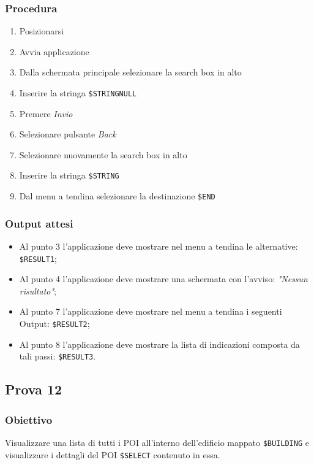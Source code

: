 \documentclass[../Sperimentazione.tex]{subfiles}
\begin{document}
	\subsubsection{Procedura}
		\begin{enumerate}
		
		
		\item Posizionarsi 
		\item Avvia applicazione
		\item Dalla schermata principale selezionare la search box in alto
		\item Inserire la stringa  \verb|$STRINGNULL|
		\item Premere \textit{Invio}
		\item Selezionare pulsante \textit{Back}
		\item Selezionare nuovamente la search box in alto
		\item Inserire la stringa  \verb|$STRING|
		\item Dal menu a tendina selezionare la destinazione  \verb|$END|
		\end{enumerate}
		
	\subsubsection{Output attesi}
		\begin{itemize}
		\item Al punto 3 l'applicazione deve mostrare nel menu a tendina le alternative:  \verb|$RESULT1|;
		\item Al punto 4 l'applicazione deve mostrare una schermata con l'avviso: \textit{"Nessun risultato"};
		\item Al punto 7 l'applicazione deve mostrare nel menu a tendina i seguenti Output:  \verb|$RESULT2|;
		\item Al punto 8 l'applicazione deve mostrare la lista di indicazioni composta da tali passi:  \verb|$RESULT3|.
		\end{itemize}

	


\newpage	
\subsection{Prova 12} %
\label{subsec:Prova12}
	
	\subsubsection{Obiettivo}
		Visualizzare una lista di tutti i POI all'interno dell'edificio mappato  \verb|$BUILDING| e visualizzare i dettagli del POI  \verb|$SELECT| contenuto in essa.
		
\end{document}
